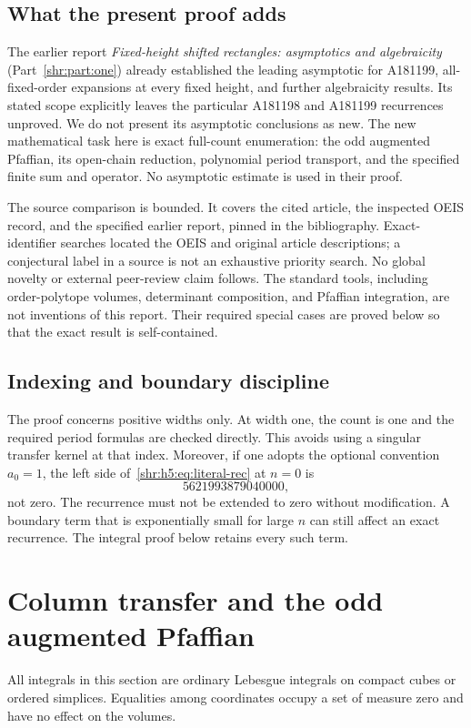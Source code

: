 \documentclass[11pt,letterpaper]{article}
\numberwithin{equation}{section}
\theoremstyle{definition}
\newcommand{\1}{\mathbf 1}
\begin{document}
\subsection{What the present proof adds}
The earlier report \emph{Fixed-height shifted rectangles: asymptotics and
algebraicity} (Part~\ref{shr:part:one}) already established the leading asymptotic for
A181199, all-fixed-order expansions at every fixed height, and further
algebraicity results. Its stated scope explicitly leaves the particular
A181198 and A181199 recurrences unproved. We do not present its
asymptotic conclusions as new. The new mathematical task here is exact
full-count enumeration: the odd augmented Pfaffian, its open-chain
reduction, polynomial period transport, and the specified finite sum and
operator. No asymptotic estimate is used in their proof.

The source comparison is bounded. It covers the cited article, the
inspected OEIS record, and the specified earlier report, pinned in the
bibliography. Exact-identifier searches located the OEIS and original
article descriptions; a conjectural label in a source is not an exhaustive
priority search. No global novelty or external peer-review claim follows.
The standard tools, including order-polytope volumes, determinant
composition, and Pfaffian integration, are not inventions of this report.
Their required special cases are proved below so that the exact result is
self-contained.

\subsection{Indexing and boundary discipline}
The proof concerns positive widths only. At width one, the count is one
and the required period formulas are checked directly. This avoids using a
singular transfer kernel at that index. Moreover, if one adopts the
optional convention $a_0=1$, the left side of~\eqref{shr:h5:eq:literal-rec} at
$n=0$ is
\[
 5621993879040000,
\]
not zero. The recurrence must not be extended to zero without modification.
A boundary term that is exponentially small for large $n$ can still affect
an exact recurrence. The integral proof below retains every such term.

\section{Column transfer and the odd augmented Pfaffian}
\label{shr:h5:sec:transfer}
All integrals in this section are ordinary Lebesgue integrals on compact
cubes or ordered simplices. Equalities among coordinates occupy a set of
measure zero and have no effect on the volumes.
\end{document}
